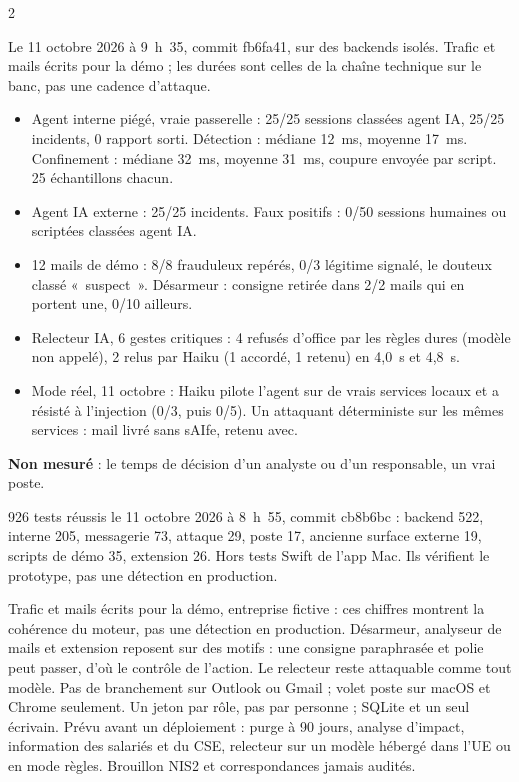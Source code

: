 \documentclass[7.6pt]{extarticle}
\newcommand{\h}[1]{\vspace{2pt}{\bfseries\color{accent}\small #1}\par\vspace{0.3pt}}
\newcommand{\cmd}[1]{{\ttfamily #1}}
\begin{document}
\begin{multicols}{2}
\columnbreak
\h{Ce qu’on a mesuré}
Le 11 octobre 2026 à 9~h~35, commit \cmd{fb6fa41}, sur des backends isolés. Trafic et mails écrits pour la démo ; les durées sont celles de la chaîne technique sur le banc, pas une cadence d’attaque.
\begin{itemize}
\item Agent interne piégé, vraie passerelle : 25/25 sessions classées agent IA, 25/25 incidents, 0 rapport sorti. Détection : médiane 12~ms, moyenne 17~ms. Confinement : médiane 32~ms, moyenne 31~ms, coupure envoyée par script. 25 échantillons chacun.
\item Agent IA externe : 25/25 incidents. Faux positifs : 0/50 sessions humaines ou scriptées classées agent IA.
\item 12 mails de démo : 8/8 frauduleux repérés, 0/3 légitime signalé, le douteux classé «~suspect~». Désarmeur : consigne retirée dans 2/2 mails qui en portent une, 0/10 ailleurs.
\item Relecteur IA, 6 gestes critiques : 4 refusés d’office par les règles dures (modèle non appelé), 2 relus par Haiku (1 accordé, 1 retenu) en 4,0~s et 4,8~s.
\item Mode réel, 11 octobre : Haiku pilote l’agent sur de vrais services locaux et a résisté à l’injection (0/3, puis 0/5). Un attaquant déterministe sur les mêmes services : mail livré sans sAIfe, retenu avec.
\end{itemize}
\textbf{Non mesuré} : le temps de décision d’un analyste ou d’un responsable, un vrai poste.

\h{Tests}
926 tests réussis le 11 octobre 2026 à 8~h~55, commit \cmd{cb8b6bc} : backend 522, interne 205, messagerie 73, attaque 29, poste 17, ancienne surface externe 19, scripts de démo 35, extension 26. Hors tests Swift de l’app Mac. Ils vérifient le prototype, pas une détection en production.

\h{Limites}
Trafic et mails écrits pour la démo, entreprise fictive : ces chiffres montrent la cohérence du moteur, pas une détection en production. Désarmeur, analyseur de mails et extension reposent sur des motifs : une consigne paraphrasée et polie peut passer, d’où le contrôle de l’action. Le relecteur reste attaquable comme tout modèle. Pas de branchement sur Outlook ou Gmail ; volet poste sur macOS et Chrome seulement. Un jeton par rôle, pas par personne ; SQLite et un seul écrivain. Prévu avant un déploiement : purge à 90 jours, analyse d’impact, information des salariés et du CSE, relecteur sur un modèle hébergé dans l’UE ou en mode règles. Brouillon NIS2 et correspondances jamais audités.


\end{multicols}
\end{document}
